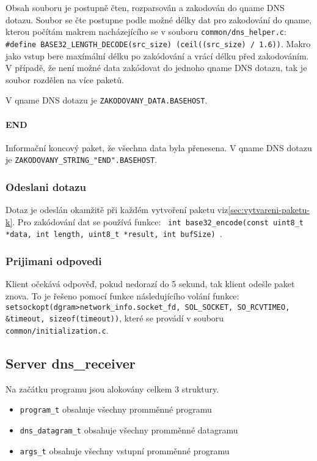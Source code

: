 Obsah souboru je postupně čten, rozparsován a zakodován do qname DNS dotazu.
Soubor se čte postupne podle možné délky dat pro
zakodování do qname, kterou počítám
makrem nacházejícího se v souboru \texttt{common/dns\_helper.c}:
\texttt{\#define BASE32\_LENGTH\_DECODE(src\_size) (ceil((src\_size) / 1.6))}.
Makro jako vstup bere maxímální délku po zakódování a vrácí délku před zakodováním.
V případě, že není možné data zakódovat do jednoho qname DNS dotazu,
tak je soubor rozdělen na více paketů.

V qname DNS dotazu je \texttt{ZAKODOVANY\_DATA.BASEHOST}.

\paragraph{END}

Informační koncový paket, že všechna data byla přenesena.
V qname DNS dotazu je \texttt{ZAKODOVANY\_STRING\_"END".BASEHOST}.

\subsubsection{Odeslani dotazu} \label{sec:odeslani-dotazu-k}
Dotaz je odeslán okamžitě při každém vytvoření paketu viz\ref{sec:vytvareni-paketu-k}.
Pro zakódování dat se používá funkce:
\texttt{ int base32\_encode(const uint8\_t *data, int length, uint8\_t *result, int bufSize) }\cite{encodingData}.

\subsubsection{Prijimani odpovedi}\label{sec:prijimani-odpovedi-k}
Klient očekává odpověď, pokud nedorazí do 5 sekund, tak klient
odešle paket znova.
To je řešeno pomocí funkce následujícího volání funkce:
\texttt{setsockopt(dgram\->network\_info.socket\_fd, SOL\_SOCKET, SO\_RCVTIMEO, \&timeout, sizeof(timeout))},
které se provádí v souboru \texttt{common/initialization.c}.



\subsection{Server \- dns\_receiver}

Na začátku programu jsou alokovány celkem 3 struktury.

\begin{itemize}
    \item \texttt{program\_t} \- obsahuje všechny promměnné programu
    \item \texttt{dns\_datagram\_t} \- obsahuje všechny promměnné datagramu
    \item \texttt{args\_t} \- obsahuje všechny vstupní promměnné programu
\end{itemize}

